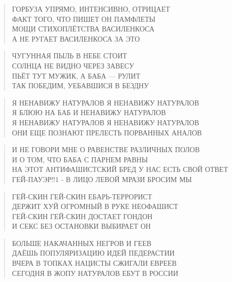 \poemtitle{***}
\begin{verse}
ГОРБУЗА УПРЯМО, ИНТЕНСИВНО, ОТРИЦАЕТ\\
ФАКТ ТОГО, ЧТО ПИШЕТ ОН ПАМФЛЕТЫ\\
МОЩИ СТИХОПЛЁТСТВА ВАСИЛЕНКОСА\\
А НЕ РУГАЕТ ВАСИЛЕНКОСА ЗА ЭТО
\end{verse}

\poemtitle{***}
\begin{verse}
ЧУГУННАЯ ПЫЛЬ В НЕБЕ СТОИТ\\
СОЛНЦА НЕ ВИДНО ЧЕРЕЗ ЗАВЕСУ\\
ПЬЁТ ТУТ МУЖИК, А БАБА — РУЛИТ\\
ТАК ПОБЕДИМ, УЕБАВШИСЯ В БЕЗДНУ
\end{verse}

\poemtitle{***}
\begin{verse}
Я НЕНАВИЖУ НАТУРАЛОВ Я НЕНАВИЖУ НАТУРАЛОВ\\
Я БЛЮЮ НА БАБ И НЕНАВИЖУ НАТУРАЛОВ\\
Я НЕНАВИЖУ НАТУРАЛОВ Я НЕНАВИЖУ НАТУРАЛОВ\\
ОНИ ЕЩЕ ПОЗНАЮТ ПРЕЛЕСТЬ ПОРВАННЫХ АНАЛОВ
\end{verse}

\poemtitle{***}
\begin{verse}
И НЕ ГОВОРИ МНЕ О РАВЕНСТВЕ РАЗЛИЧНЫХ ПОЛОВ\\
И О ТОМ, ЧТО БАБА С ПАРНЕМ РАВНЫ\\
НА ЭТОТ АНТИФАШИСТСКИЙ БРЕД У НАС ЕСТЬ СВОЙ ОТВЕТ\\
ГЕЙ-ПАУЭР!!1 - В ЛИЦО ЛЕВОЙ МРАЗИ БРОСИМ МЫ
\end{verse}

\poemtitle{***}
\begin{verse}
ГЕЙ-СКИН ГЕЙ-СКИН ЕБАРЬ-ТЕРРОРИСТ\\
ДЕРЖИТ ХУЙ ОГРОМНЫЙ В РУКЕ НЕОФАШИСТ\\
ГЕЙ-СКИН ГЕЙ-СКИН ДОСТАЕТ ГОНДОН\\
И СЕКС БЕЗ ОСТАНОВКИ ВЫБИРАЕТ ОН
\end{verse}

\poemtitle{***}
\begin{verse}
БОЛЬШЕ НАКАЧАННЫХ НЕГРОВ И ГЕЕВ\\
ДАЁШЬ ПОПУЛЯРИЗАЦИЮ ИДЕЙ ПЕДЕРАСТИИ\\
ВЧЕРА В ТОПКАХ НАЦИСТЫ СЖИГАЛИ ЕВРЕЕВ\\
СЕГОДНЯ В ЖОПУ НАТУРАЛОВ ЕБУТ В РОССИИ
\end{verse}

